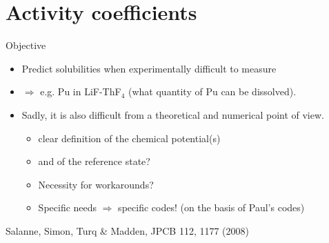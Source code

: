 \documentclass{beamer}
\begin{document}
\section{Activity coefficients}
\begin{frame}{Objective}
    \begin{itemize}
        \item Predict solubilities when experimentally difficult to measure
        \item $\Rightarrow$ e.g. Pu in LiF-ThF$_4$ (what quantity of Pu can be dissolved).
        \item Sadly, it is also difficult from a theoretical and numerical point of view.
        \begin{itemize}
            \item clear definition of the chemical potential(s)
            \item and of the reference state?
            \item Necessity for workarounds?
            \item Specific needs $\Rightarrow$ specific codes! (on the basis of Paul's codes)
        \end{itemize}
    \end{itemize}
    \scriptsize{Salanne, Simon, Turq \& Madden, JPCB 112, 1177 (2008)}
\end{frame}
\end{document}
